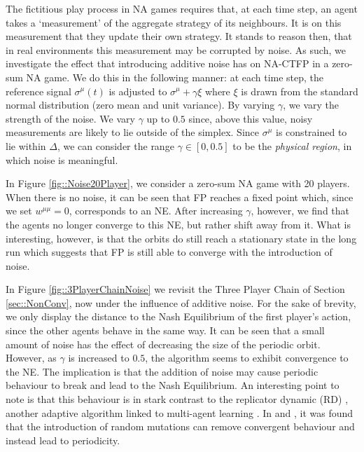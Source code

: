 \documentclass{article}
\theoremstyle{definition}
\newcommand{\refmu}{\sigma^{\mu}}
\begin{document}
  The fictitious play process in NA games requires that, at each time step, an agent takes a
  `measurement' of the aggregate strategy of its neighbours. It is on this measurement that they
  update their own strategy. It stands to reason then, that in real environments this measurement
  may be corrupted by noise. 
%  
  As such, we investigate the effect that introducing additive noise has
  on NA-CTFP in a zero-sum NA game. We do this in the following manner: at each time step, the
  reference signal $\refmu(t)$ is adjusted to $\refmu + \gamma \xi$ where $\xi$ is drawn from the
  standard normal distribution (zero mean and unit variance). By varying $\gamma$, we vary the
  strength of the noise. We vary $\gamma$ up to $0.5$ since, above this value, noisy measurements
  are likely to lie outside of the simplex. Since $\refmu$ is constrained to lie within $\Delta$, we
  can consider the range $\gamma \in [0, 0.5]$ to be the \emph{physical region}, in which noise is meaningful.

  In Figure \ref{fig::Noise20Player}, we consider a zero-sum NA game with 20 players. When there is
  no noise, it can be seen that FP reaches a fixed point which, since we set $w^{\mu \mu} = 0$,
  corresponds to an NE. After increasing $\gamma$, however, we find that the agents no longer
  converge to this NE, but rather shift away from it. What is interesting, however, is that the
  orbits do still reach a stationary state in the long run which suggests that FP is still able to
  converge with the introduction of noise.

  In Figure \ref{fig::3PlayerChainNoise} we revisit the Three Player Chain of Section
  \ref{sec::NonConv}, now under the influence of additive noise. For the sake of brevity, we only
  display the distance to the Nash Equilibrium of the first player's action, since the other agents
  behave in the same way. It can be seen that a small amount of noise has the effect of decreasing
  the size of the periodic orbit. However, as $\gamma$
  is increased to $0.5$, the algorithm seems to exhibit convergence to the NE. The implication is
  that the addition of noise may cause periodic behaviour to break and lead to the Nash Equilibrium.
  An interesting point to note is that this behaviour is in stark contrast to the replicator
  dynamic (RD) \cite{Smith1982}, another adaptive algorithm linked to multi-agent learning
  \cite{Mertikopoulos2018}. In \cite{Imhof2005} and \cite{Galla2011}, it was found that the
  introduction of random mutations can remove convergent behaviour and instead lead to periodicity. 
  
\end{document}
